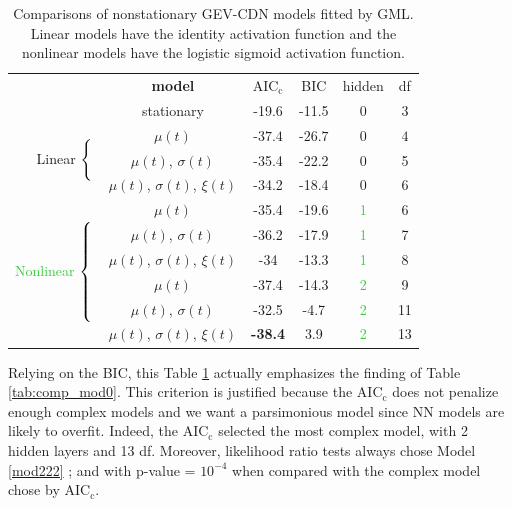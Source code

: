 \begin{table}[!htbp] 
	\centering \caption{Comparisons of nonstationary GEV-CDN models fitted by GML. Linear models have the identity activation function and the nonlinear models have the logistic sigmoid activation function. } 
	\label{tab:comp_mod} 
	\hspace{-2.5cm}
\begin{tabular}{@{\extracolsep{5pt}} rccccc} 
	\cmidrule[\heavyrulewidth]{2-6}
 &	\textbf{model} & $\text{AIC}_{\text{c}}$ & BIC & hidden & df \\
	\cmidrule{2-6}
	
	& stationary & -19.6 & -11.5 & 0 & 3 \\ 
	\multirow{3}{*}{Linear $\begin{dcases*} \\ \\  \end{dcases*}$} 
	&$\mu(t)$ & -$37.4$ & -$\boldsymbol{26.7}$ & $0$ & $4$  \\ \hspace{-0.5cm}
	&$\mu(t)$, $\sigma(t)$ & -35.4 & -22.2 & 0 & 5 \\
	&$\mu(t)$, $\sigma(t)$, $\xi(t)$ & -34.2 & -18.4 & 0 & 6 \\
	
	 \multirow{6}{*}{\textcolor{LimeGreen}{Nonlinear} $\begin{dcases*} \\ \\ \\ \\ \\ \end{dcases*}$} &	$\mu(t)$ & -35.4 & -19.6 & \textcolor{LimeGreen}{1} & 6 \\
	&$\mu(t)$, $\sigma(t)$ &  -36.2  & -17.9 & \textcolor{LimeGreen}{1} & 7 \\ 
	&$\mu(t)$, $\sigma(t)$, $\xi(t)$ & -34 & -13.3 & \textcolor{LimeGreen}{1} & 8 \\
	&$\mu(t)$ & -37.4 & -14.3 & \textcolor{LimeGreen}{2} & 9 \\
	&$\mu(t)$, $\sigma(t)$ & -32.5 & -4.7 & \textcolor{LimeGreen}{2} & 11 \\
	&$\mu(t)$, $\sigma(t)$, $\xi(t)$ & \textbf{-38.4} & 3.9 & \textcolor{LimeGreen}{2} & 13 \\		\cmidrule[\heavyrulewidth]{2-6}
\end{tabular}
\end{table}

Relying on the BIC, this Table \ref{tab:comp_mod} actually emphasizes the finding of Table \ref{tab:comp_mod0}. This criterion is justified because the $\text{AIC}_{\text{c}}$ does not penalize enough complex models and we want a parsimonious model since NN models are likely to overfit. Indeed, the $\text{AIC}_{\text{c}}$ selected the most complex model, with 2 hidden layers and 13 df.  Moreover, likelihood ratio tests always chose Model \ref{mod222} ; and with p-value = $10^{-4}$ when compared with the complex model chose by $\text{AIC}_{\text{c}}$.
 	
